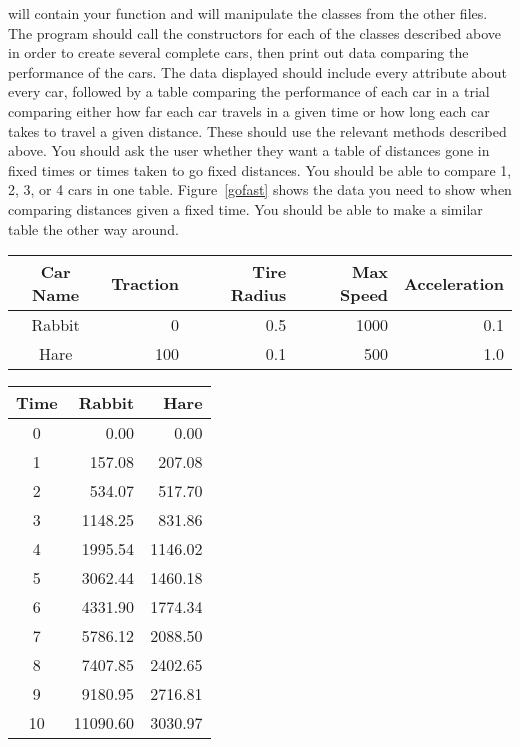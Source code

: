 \documentclass[11pt]{cselabheader}
\begin{document}
\begin{ex}
   will contain your  function and will
  manipulate the classes from the other files. The program should call the
  constructors for each of the classes described above in order to create
  several complete cars, then print out data comparing the performance of the
  cars. The data displayed should include every attribute about every car,
  followed by a table comparing the performance of each car in a trial
  comparing either how far each car travels in a given time or how long each
  car takes to travel a given distance. These should use the relevant methods
  described above. You should ask the user whether they want a table of distances
  gone in fixed times or times taken to go fixed distances. You should be able
  to compare 1, 2, 3, or 4 cars in one table. Figure~\ref{gofast} shows the
  data you need to show when comparing distances given a fixed time. You should be
  able to make a similar table the other way around.
  
  \begin{center}
    \begin{tabular}{crrrr}
    \toprule
    Car Name & Traction & Tire Radius & Max Speed & Acceleration\\
    \midrule
    Rabbit & 0 & 0.5 & 1000 & 0.1\\
    Hare & 100 & 0.1 & 500 & 1.0\\
    \bottomrule
    \end{tabular}
  \end{center}
  
  \begin{center}
    \begin{tabular}{crr}
    \toprule
    Time & Rabbit & Hare\\
    \midrule
    0 & 0.00 & 0.00\\
    1 & 157.08 & 207.08\\
    2 & 534.07 & 517.70\\
    3 & 1148.25 & 831.86\\
    4 & 1995.54 & 1146.02\\
    5 & 3062.44 & 1460.18\\
    6 & 4331.90 & 1774.34\\
    7 & 5786.12 & 2088.50\\
    8 & 7407.85 & 2402.65\\
    9 & 9180.95 & 2716.81\\
    10 & 11090.60 & 3030.97\\
    \bottomrule
    \end{tabular}
    \label{gofast}
  \end{center}
  

\end{ex}
\end{document}

